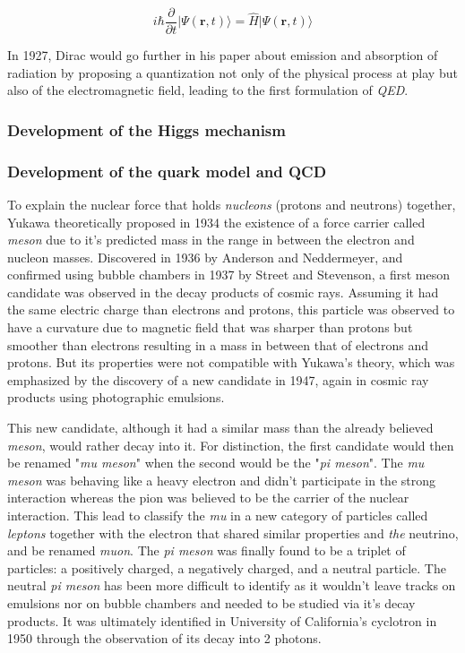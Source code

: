 	\begin{equation}
		\label{eq:schrodinger}
		i\hbar \frac{\partial}{\partial t} \vert \Psi(\mathbf{r},t)\rangle  = \hat{H} \vert \Psi(\mathbf{r},t)\rangle
	\end{equation}
	
	In 1927, Dirac would go further in his paper about emission and absorption of radiation by proposing a quantization not only of the physical process at play but also of the electromagnetic field, leading to the first formulation of \textit{\acf{QED}}.
	
	\subsubsection*{Development of the Higgs mechanism}
	\label{chapt2:sssec:Higgs}
	
	\subsubsection*{Development of the quark model and \acl{QCD}}
	\label{chapt2:sssec:quark}
	
	To explain the nuclear force that holds \textit{nucleons} (protons and neutrons) together, Yukawa theoretically proposed in 1934 the existence of a force carrier called \textit{meson} due to it's predicted mass in the range in between the electron and nucleon masses. Discovered in 1936 by Anderson and Neddermeyer, and confirmed using bubble chambers in 1937 by Street and Stevenson, a first meson candidate was observed in the decay products of cosmic rays. Assuming it had the same electric charge than electrons and protons, this particle was observed to have a curvature due to magnetic field that was sharper than protons but smoother than electrons resulting in a mass in between that of electrons and protons. But its properties were not compatible with Yukawa's theory, which was emphasized by the discovery of a new candidate in 1947, again in cosmic ray products using photographic emulsions.
	
	This new candidate, although it had a similar mass than the already believed \textit{meson}, would rather decay into it. For distinction, the first candidate would then be renamed "\textit{mu meson}" when the second would be the "\textit{pi meson}". The \textit{mu meson} was behaving like a heavy electron and didn't participate in the strong interaction whereas the pion was believed to be the carrier of the nuclear interaction. This lead to classify the \textit{mu} in a new category of particles called \textit{leptons} together with the electron that shared similar properties and \textit{the} neutrino, and be renamed \textit{muon}. The \textit{pi meson} was finally found to be a triplet of particles: a positively charged, a negatively charged, and a neutral particle. The neutral \textit{pi meson} has been more difficult to identify as it wouldn't leave tracks on emulsions nor on bubble chambers and needed to be studied via it's decay products. It was ultimately identified in University of California's cyclotron in 1950 through the observation of its decay into 2 photons.
	
